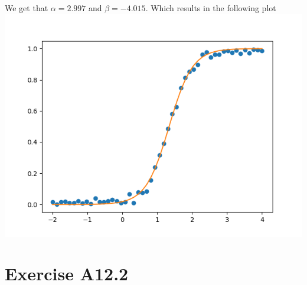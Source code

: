 We get that $\alpha=2.997$ and $\beta=-4.015$. Which results in the following
plot\\
\includegraphics[width=\textwidth]{test.png}
\section*{Exercise A12.2}
